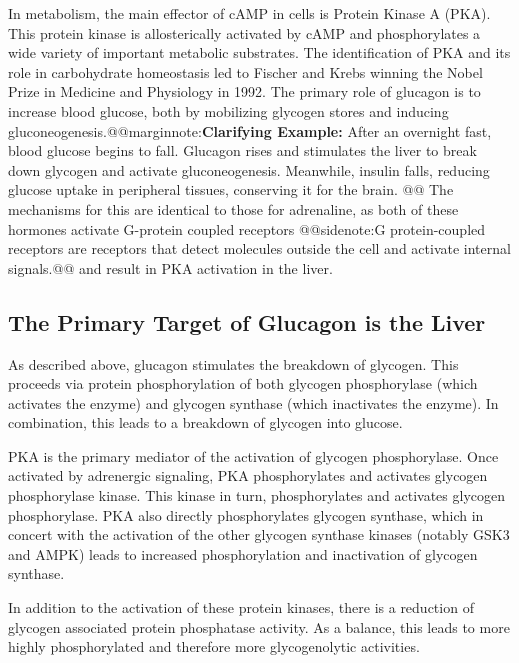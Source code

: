 \documentclass{tufte-handout}
\makeatletter
\def\marginnote#1{@@marginnote:#1@@}
\def\sidenote#1{@@sidenote:#1@@}
\makeatother
\begin{document}
In metabolism, the main effector of cAMP in cells is Protein Kinase A (PKA).  This protein kinase is allosterically activated by cAMP and phosphorylates a wide variety of important metabolic substrates.  The identification of PKA and its role in carbohydrate homeostasis led to Fischer and Krebs winning the Nobel Prize in Medicine and Physiology in 1992.  The primary role of glucagon is to increase blood glucose, both by mobilizing glycogen stores and inducing gluconeogenesis.\marginnote{\textbf{Clarifying Example:} After an overnight fast, blood glucose begins to fall. Glucagon rises and stimulates the liver to break down glycogen and activate gluconeogenesis. Meanwhile, insulin falls, reducing glucose uptake in peripheral tissues, conserving it for the brain.
}  The mechanisms for this are identical to those for adrenaline, as both of these hormones activate G-protein coupled receptors \sidenote{G protein-coupled receptors are receptors that detect molecules outside the cell and activate internal signals.} and result in PKA activation in the liver.

\subsection{The Primary Target of Glucagon is the Liver}

As described above, glucagon stimulates the breakdown of glycogen.  This proceeds via protein phosphorylation of both glycogen phosphorylase (which activates the enzyme) and glycogen synthase (which inactivates the enzyme).  In combination, this leads to a breakdown of glycogen into glucose.

PKA is the primary mediator of the activation of glycogen phosphorylase.  Once activated by adrenergic signaling, PKA phosphorylates and activates glycogen phosphorylase kinase.  This kinase in turn, phosphorylates and activates glycogen phosphorylase\citep{Krebs1956}.  PKA also directly phosphorylates glycogen synthase, which in concert with the activation of the other glycogen synthase kinases (notably GSK3 and AMPK) leads to increased phosphorylation and inactivation of glycogen synthase.

In addition to the activation of these protein kinases, there is a reduction of glycogen associated protein phosphatase activity.  As a balance, this leads to more highly phosphorylated and therefore more glycogenolytic activities.
\end{document}
